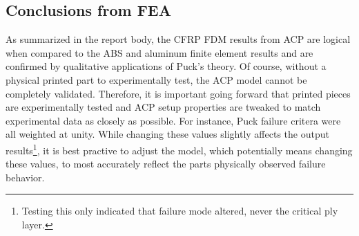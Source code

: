 \clearpage

\subsection{Conclusions from FEA}

As summarized in the report body, the CFRP FDM results from ACP are logical when compared to the ABS and aluminum finite element results and are confirmed by qualitative applications of Puck's theory. Of course, without a physical printed part to experimentally test, the ACP model cannot be completely validated. Therefore, it is important going forward that printed pieces are experimentally tested and ACP setup properties are tweaked to match experimental data as closely as possible. For instance, Puck failure critera were all weighted at unity. While changing these values slightly affects the output results\footnote{Testing this only indicated that failure mode altered, never the critical ply layer.}, it is best practive to adjust the model, which potentially means changing these values, to most accurately reflect the parts physically observed failure behavior.\\

\clearpage
